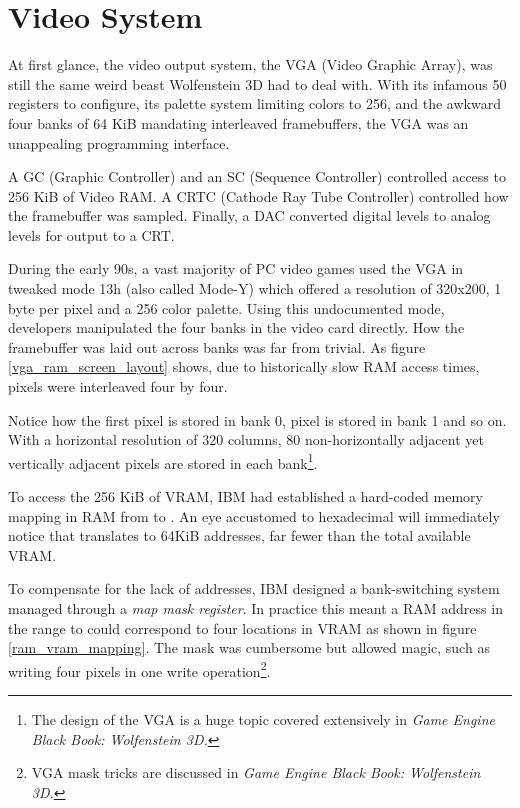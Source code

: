 \section{Video System}
At first glance, the video output system, the VGA (Video Graphic Array), was still the same weird beast Wolfenstein 3D had to deal with. With its infamous 50 registers to configure, its palette system limiting colors to 256, and the awkward four banks of 64 KiB mandating interleaved framebuffers, the VGA was an unappealing programming interface.\\
\par
A GC (Graphic Controller) and an SC (Sequence Controller) controlled access to 256 KiB of Video RAM. A CRTC (Cathode Ray Tube Controller) controlled how the framebuffer was sampled. Finally, a DAC converted digital levels to analog levels for output to a CRT.\\
\par 	
{}
\par
During the early 90s, a vast majority of PC video games used the VGA in tweaked mode 13h (also called Mode-Y) which offered a resolution of 320x200, 1 byte per pixel and a 256 color palette. Using this undocumented mode, developers manipulated the four banks in the video card directly. How the framebuffer was laid out across banks was far from trivial. As figure \ref{vga_ram_screen_layout} shows, due to historically slow RAM access times, pixels were interleaved four by four.




\par

Notice how the first pixel  is stored in bank 0, pixel  is stored in bank 1 and so on. With a horizontal resolution of 320 columns, 80 non-horizontally adjacent yet vertically adjacent pixels are stored in each bank\footnote{The design of the VGA is a huge topic covered extensively in \it{Game Engine Black Book: Wolfenstein 3D}.}.\\
\par
To access the 256 KiB of VRAM, IBM had established a hard-coded memory mapping in RAM from  to . An eye accustomed to hexadecimal will immediately notice that  translates to 64KiB addresses, far fewer than the total available VRAM.\\
\par
 To compensate for the lack of addresses, IBM designed a bank-switching system managed through a \textit{map mask register}. In practice this meant a RAM address in the range  to  could correspond to four locations in VRAM as shown in figure \ref{ram_vram_mapping}. The mask was cumbersome but allowed magic, such as writing four pixels in one write operation\footnote{VGA mask tricks are discussed in \it{Game Engine Black Book: Wolfenstein 3D}.}.

